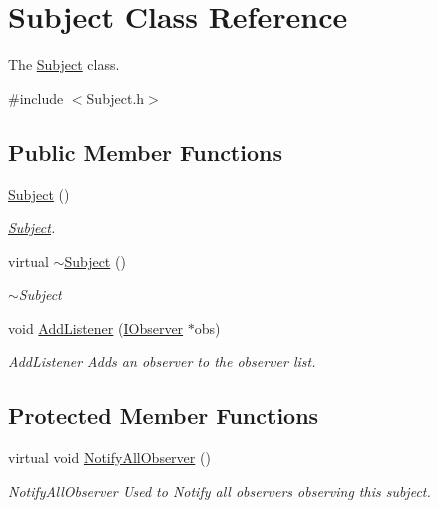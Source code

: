 \hypertarget{classSubject}{\section{Subject Class Reference}
\label{classSubject}
}


The \hyperlink{classSubject}{Subject} class.  




{\ttfamily \#include $<$Subject.\-h$>$}

\subsection*{Public Member Functions}
\begin{DoxyCompactItemize}
\item 
\hypertarget{classSubject_ab468044832c824c6d6c2f46272655207}{\hyperlink{classSubject_ab468044832c824c6d6c2f46272655207}{Subject} ()}\label{classSubject_ab468044832c824c6d6c2f46272655207}

\begin{DoxyCompactList}\small\item\em \hyperlink{classSubject}{Subject}. \end{DoxyCompactList}\item 
\hypertarget{classSubject_ae5980067d5ec5522db5a0d78100a34be}{virtual \hyperlink{classSubject_ae5980067d5ec5522db5a0d78100a34be}{$\sim$\-Subject} ()}\label{classSubject_ae5980067d5ec5522db5a0d78100a34be}

\begin{DoxyCompactList}\small\item\em $\sim$\-Subject \end{DoxyCompactList}\item 
void \hyperlink{classSubject_ad093a7ac7fea38b82f5cc333916d4a90}{Add\-Listener} (\hyperlink{classIObserver}{I\-Observer} $\ast$obs)
\begin{DoxyCompactList}\small\item\em Add\-Listener Adds an observer to the observer list. \end{DoxyCompactList}\end{DoxyCompactItemize}
\subsection*{Protected Member Functions}
\begin{DoxyCompactItemize}
\item 
\hypertarget{classSubject_ad047f9358b9d199bca40fc5f62a26fc0}{virtual void \hyperlink{classSubject_ad047f9358b9d199bca40fc5f62a26fc0}{Notify\-All\-Observer} ()}\label{classSubject_ad047f9358b9d199bca40fc5f62a26fc0}

\begin{DoxyCompactList}\small\item\em Notify\-All\-Observer Used to Notify all observers observing this subject. \end{DoxyCompactList}\end{DoxyCompactItemize}


